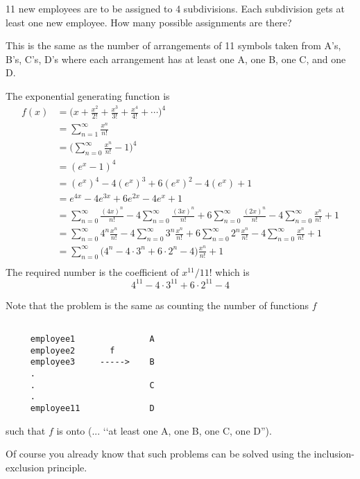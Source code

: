\newcommand\expo[1]{ \sum_{n=0}^\infty \frac{#1^n}{n!} }

\begin{eg}
11 new employees are to be assigned to 4 subdivisions.
Each subdivision gets at least one new employee.
How many possible assignments are there?
\end{eg}

This is the same as the number of arrangements of 11 symbols taken from 
A's, B's, C's, D's where
each arrangement has at least one A, one B, one C, and one D.

The exponential generating function is
\begin{align*}
f(x)
&= \biggl( x + \frac{x^2}{2!} 
   + \frac{x^3}{3!} + \frac{x^4}{4!} + \cdots \biggr)^4 \\
&= \sum_{n=1}^\infty \frac{x^n}{n!}  \\
&= \biggl( \sum_{n=0}^\infty \frac{x^n}{n!} - 1 \biggr) ^4 \\
&= ( e^x - 1 ) ^4 \\
&= (e^x)^4 - 4(e^x)^3 + 6(e^x)^2 - 4 (e^x) + 1 \\
&= e^{4x} - 4e^{3x} + 6e^{2x} - 4 e^x + 1 \\
&= \expo{(4x)} - 4 \expo{(3x)} + 6 \expo{(2x)} - 4 \expo{x} + 1 \\
&= \sum_{n=0}^\infty 4^n \frac{x^n}{n!}
   -4\sum_{n=0}^\infty 3^n \frac{x^n}{n!}
   +6\sum_{n=0}^\infty 2^n \frac{x^n}{n!}
   -4\sum_{n=0}^\infty \frac{x^n}{n!}
   + 1 \\
&= \sum_{n=0}^\infty 
   \biggl(
   4^n 
   -4 \cdot 3^n 
   +6 \cdot 2^n 
   -4  
   \biggr) \frac{x^n}{n!}
   + 1 \\
\end{align*}
The required number is the coefficient of $x^{11}/11!$ which is
\[
   4^{11}
   -4 \cdot 3^{11} 
   +6 \cdot 2^{11}
   -4  
\]

Note that the problem is the same as counting the number of 
functions $f$
\begin{verbatim}

     employee1               A
     employee2       f
     employee3     ----->    B
     .   
     .                       C
     .
     employee11              D

\end{verbatim}
such that $f$ is onto
(... \lq\lq at least one A, one B, one C, one D'').

Of course you already know that such problems can be solved using
the inclusion-exclusion principle.




